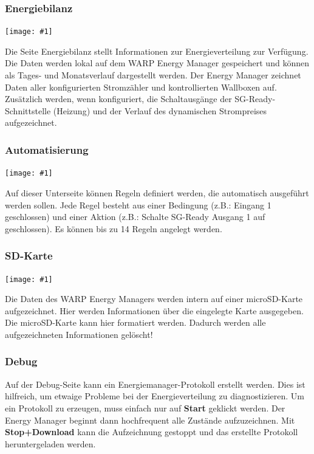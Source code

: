 \documentclass[a4paper,10pt]{article}
\newcommand{\gfx}[1]{\texttt{[image: \#1]}}
\begin{document}
\begin{multicols*}{2}
	\subsubsection{Energiebilanz}

	\gfx{./img_v2/wem2-web-energyanalysis}

	Die Seite Energiebilanz stellt Informationen zur Energieverteilung zur Verfügung.
	Die Daten werden lokal auf dem WARP Energy Manager gespeichert und
	können als Tages- und Monatsverlauf dargestellt werden.
	Der Energy Manager zeichnet Daten aller konfigurierten Stromzähler und kontrollierten Wallboxen auf. Zusätzlich werden, wenn konfiguriert,
    die Schaltausgänge der SG-Ready-Schnittstelle (Heizung) und der Verlauf des dynamischen Strompreises aufgezeichnet.

    \subsubsection{Automatisierung}

    \gfx{./img_v2/wem2-web-automation}

    Auf dieser Unterseite können Regeln definiert werden, die automatisch ausgeführt werden sollen. Jede Regel besteht aus einer Bedingung (z.B.: \glqq Eingang 1 geschlossen\grqq)
    und einer Aktion (z.B.: \glqq Schalte SG-Ready Ausgang 1 auf geschlossen\grqq).
    Es können bis zu 14 Regeln angelegt werden.

    \subsubsection{SD-Karte}

    \gfx{./img/resized/web_em_sdcard}

    Die Daten des WARP Energy Managers werden intern auf einer microSD-Karte
	aufgezeichnet. Hier werden Informationen über die eingelegte Karte ausgegeben. Die microSD-Karte kann
	hier formatiert werden. Dadurch werden alle aufgezeichneten Informationen gelöscht!

	\subsubsection{Debug}
	Auf der Debug-Seite kann ein Energiemanager-Protokoll erstellt werden. Dies
	ist hilfreich, um etwaige Probleme bei der Energieverteilung zu diagnostizieren. Um
	ein Protokoll zu erzeugen, muss einfach nur auf \textbf{Start} geklickt
	werden. Der Energy Manager beginnt dann hochfrequent alle Zustände
	aufzuzeichnen. Mit \textbf{Stop+Download} kann die Aufzeichnung gestoppt und
	das erstellte Protokoll heruntergeladen werden.


\end{multicols*}
\end{document}
